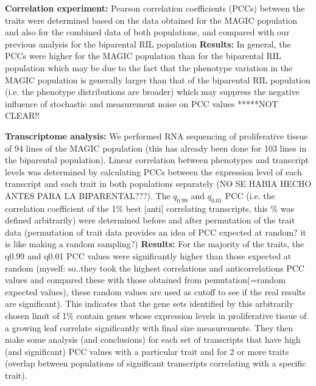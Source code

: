 \documentclass[a4paper,10pt]{article}
\begin{document}
\textbf{Correlation experiment:} Pearson correlation coefficients (PCCs) between the traits were determined based on the data obtained for the MAGIC population and also for the combined data of both populations, and compared with our previous analysis for the biparental RIL population
\textbf{Results:} In general, the PCCs were higher for the MAGIC population than for the biparental RIL population which may be due to the fact that the phenotype variation in the MAGIC population is generally larger than that
of the biparental RIL population  (i.e. the phenotype distributions are broader) which may suppress the negative influence of stochastic and measurement noise on PCC values *****NOT CLEAR!!


\textbf{Transcriptome analysis:} We performed RNA sequencing of proliferative tissue of 94 lines of the MAGIC population (this has already been done for 103 lines in the biparental population).
Linear correlation between phenotypes and transcript levels was determined by calculating PCCs between the expression level of each transcript and each trait in both populations separately (NO SE HABIA HECHO ANTES PARA LA BIPARENTAL???).
The $q_0.99$ and $q_0.01$ PCC (i.e. the correlation coefficient of the 1\% best [anti] correlating transcripts, this \% was defined arbitrarily) were determined before and after permutation of the trait data (permutation of trait data provides an idea of PCC expected at random? it is like making a random sampling?)
\textbf{Results:} For the majority of the traits, the q0.99 and q0.01 PCC values were significantly higher than those expected at random (myself: so..they took the highest correlations and anticorrelations PCC values and compared these with those obtained from pemutation(=random expected values), these random values are used as cutoff to see if the real results are significant).
This indicates that the gene sets identified by this arbitrarily chosen limit of 1\% contain genes whose expression levels in proliferative tissue of a growing leaf correlate significantly with final size measurements.
They then make some analysis (and conclusions) for each set of transcripts that have high (and significant) PCC values with a particular trait and for 2 or more traits (overlap between populations of significant transcripts correlating with a specific trait).  
\end{document}
